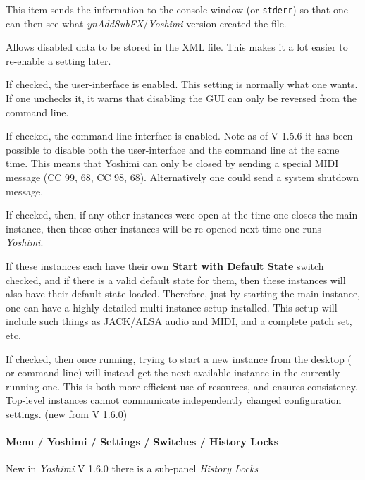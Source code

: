    This item sends the information to the console window
   (or \texttt{stderr}) so that
   one can then see what \textsl{ynAddSubFX}/\textsl{Yoshimi}
   version created the file.

   Allows disabled data to be stored in the XML file.
   This makes it a lot easier to re-enable a setting later.

   If checked, the user-interface is enabled.  This setting is normally what one
   wants.  If one unchecks it, it warns that disabling the GUI
   can only be reversed from the command line.

   If checked, the command-line interface is enabled.
   Note as of V 1.5.6 it has been possible to disable both the user-interface and
   the command line at the same time. This means that Yoshimi can only be closed
   by sending a special MIDI message (CC 99, 68, CC 98, 68). Alternatively one
   could send a system shutdown message.

      If checked, then, if any other instances were open at the time one closes
      the main instance, then these other instances will be re-opened next time
      one runs \textsl{Yoshimi}.

   If these instances each have their own
   \textbf{Start with Default State} switch checked, and if
   there is a valid default state for them, then these instances will also have
   their default state loaded.
   Therefore, just by starting the main instance, one can have a
   highly-detailed multi-instance setup installed.
   This setup will include such things as JACK/ALSA audio
   and MIDI, and a complete patch set, etc.

      If checked, then once running, trying to start a new instance from the
      desktop ( or command line) will instead get the next available instance in
      the currently running one. This is both more efficient use of resources,
      and ensures consistency. Top-level instances cannot communicate independently
      changed configuration settings. (new from V 1.6.0)

   \paragraph{Menu / Yoshimi / Settings / Switches / History Locks}
   \label{paragraph:menu_yoshimi_settings_historylocks}
   New in \textsl{Yoshimi} V 1.6.0 there is a sub-panel \textsl{History Locks}

